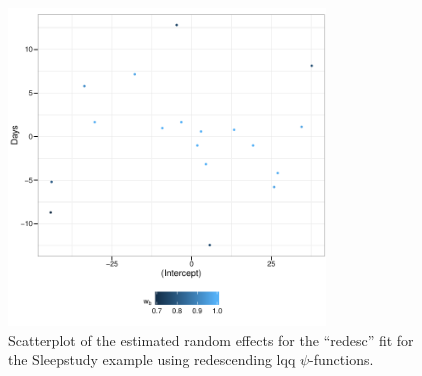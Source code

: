 \documentclass[11pt, a4paper]{article}
\theoremstyle{note}
\begin{document}
\begin{figure}[htb!]
  \centering
  \includegraphics[width=0.75\textwidth]{figs/fig-ex-sleepstudy-ranef-scatterplot}
  \caption{Scatterplot of the estimated random effects for the ``redesc''
    fit for the Sleepstudy example using redescending lqq
    $\psi$-functions.}
  \label{fig:ranefSleepstudy}
\end{figure}




\clearpage
\end{document}
